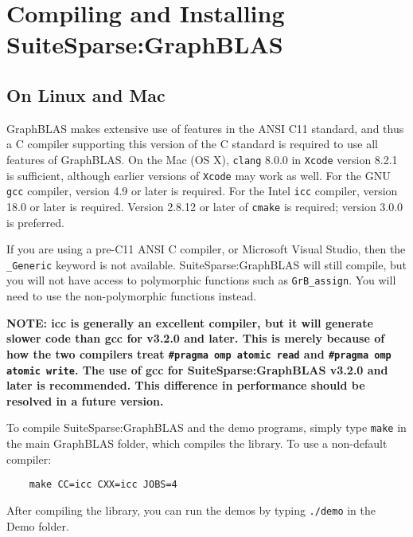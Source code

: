 \documentclass[12pt]{article}
\begin{document}
\newpage
\section{Compiling and Installing SuiteSparse:GraphBLAS}
\label{sec:install}

\subsection{On Linux and Mac}

GraphBLAS makes extensive use of features in the ANSI C11 standard, and thus a
C compiler supporting this version of the C standard is required to use
all features of GraphBLAS.  On the Mac
(OS X), \verb'clang' 8.0.0 in \verb'Xcode' version 8.2.1 is sufficient,
although earlier versions of \verb'Xcode' may work as well.  For the GNU
\verb'gcc' compiler, version 4.9 or later is required.  For the Intel
\verb'icc' compiler, version 18.0 or later is required.  Version 2.8.12 or
later of \verb'cmake' is required; version 3.0.0 is preferred.

If you are using a pre-C11 ANSI C compiler, or Microsoft Visual Studio,
then the \verb'_Generic' keyword is not available.  SuiteSparse:GraphBLAS
will still compile, but you will not have access to polymorphic functions
such as \verb'GrB_assign'.  You will need to use the non-polymorphic functions
instead.

{\bf NOTE: icc is generally an excellent compiler, but it will generate slower
code than gcc for v3.2.0 and later.  This is merely because of how the two
compilers treat \verb'#pragma omp atomic read' and \verb'#pragma omp atomic write'.
The use of gcc for SuiteSparse:GraphBLAS v3.2.0 and later is recommended.  This
difference in performance should be resolved in a future version.}

To compile SuiteSparse:GraphBLAS and the demo programs, simply type \verb'make'
in the main GraphBLAS folder, which compiles the library.  To use a
non-default compiler:

    {\small
    \begin{verbatim}
    make CC=icc CXX=icc JOBS=4 \end{verbatim} }

After compiling the library, you can run the demos by typing \verb'./demo'
in the Demo folder.
\end{document}
